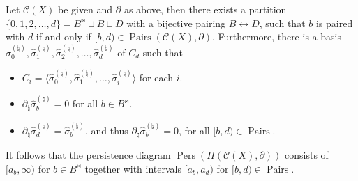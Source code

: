 \begin{theorem}
	{\cite[Theorem 2.6]{de2011dualities}} \label{persistencepartition} Let $\mathcal{C}(X)$ be given and $\partial$ as above, then there
	exists a partition $\{0,1,2, \ldots, d\} = B^{\Join} \sqcup B \sqcup D$ with a bijective pairing $B \leftrightarrow D$, such that $b$ is paired with $d$ if and only if $[b,d) \in \operatorname{Pairs}(\mathcal{C}(X), \partial)$. Furthermore, there is a basis
	$\hat{\sigma}^{(\natural)}_{0}, \hat{\sigma}^{(\natural)}_{1}, \hat{\sigma}^{(\natural)}_{2}, \ldots, \hat{\sigma}^{(\natural)}_{d}$ of $C_{d}$ such
	that
	\begin{itemize}
		\item $C_{i} = \langle \hat{\sigma}^{(\natural)}_{0}, \hat{\sigma}^{(\natural)}_{1}, \ldots, \hat{\sigma}^{(\natural)}_{i} \rangle$ for
			each $i$.
		\item $\partial_{\natural}\hat{\sigma}^{(\natural)}_{b} = 0$ for all $b \in B^{\Join}$.
		\item $\partial_{\natural}\hat{\sigma}^{(\natural)}_{d} = \hat{\sigma}^{(\natural)}_{b}$, and thus
			$\partial_{\natural}\hat{\sigma}^{(\natural)}_{b} = 0$, for all $[b,d) \in \operatorname{Pairs}$.
	\end{itemize}
	It follows that the persistence diagram
	$\operatorname{Pers}(H(\mathcal{C}(X),\partial))$ consists of $[a_{b}, \infty)$ for
	$b \in B^{\Join}$ together with intervals $[a_{b},a_{d})$ for
	$[b,d) \in \operatorname{Pairs}$.
\end{theorem}

